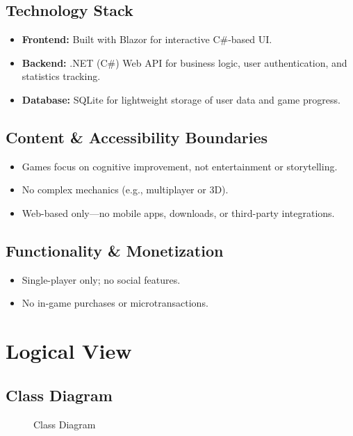 \documentclass[11pt,a4paper]{article}
\newcommand{\inputdiagram}[1]{}
\begin{document}
\subsection{Technology Stack}
\begin{itemize}
    \item \textbf{Frontend:} Built with Blazor for interactive C\#-based UI.
    \item \textbf{Backend:} .NET (C\#) Web API for business logic, user authentication, and statistics tracking.
    \item \textbf{Database:} SQLite for lightweight storage of user data and game progress.
\end{itemize}

\subsection{Content \& Accessibility Boundaries}
\begin{itemize}
    \item Games focus on cognitive improvement, not entertainment or storytelling.
    \item No complex mechanics (e.g., multiplayer or 3D).
    \item Web-based only—no mobile apps, downloads, or third-party integrations.
\end{itemize}

\subsection{Functionality \& Monetization}
\begin{itemize}
    \item Single-player only; no social features.
    \item No in-game purchases or microtransactions.
\end{itemize}



\section{Logical View}


\subsection{Class Diagram}

\begin{figure}[H]
     \centering
     \begin{adjustbox}{width=0.92\paperwidth,center}        \inputdiagram{class_diagram.tex}
     \end{adjustbox}
     \caption{Class Diagram}
     \label{fig:class_diagram}
\end{figure}
\end{document}
